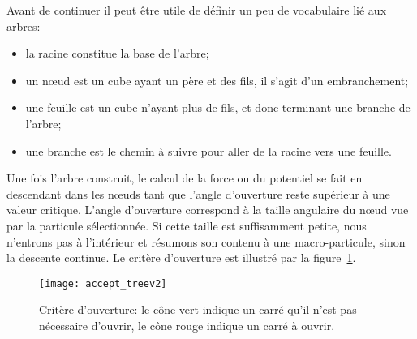 			Avant de continuer il peut être utile de définir un peu de vocabulaire lié aux arbres:
			\begin{itemize}
				\item la racine constitue la base de l'arbre;
				\item un nœud est un cube ayant un père et des fils, il s'agit d'un embranchement;
				\item une feuille est un cube n'ayant plus de fils, et donc terminant une branche de
					l'arbre;
				\item une branche est le chemin à suivre pour aller de la racine vers une feuille.
			\end{itemize}


			Une fois l'arbre construit, le calcul de la force ou du potentiel se fait en descendant dans les nœuds
			tant que l'angle d'ouverture reste supérieur à une valeur critique.
			L'angle d'ouverture correspond à la taille angulaire du nœud vue par la particule sélectionnée.
			Si cette taille est suffisamment petite, nous n'entrons pas à l'intérieur et résumons son
			contenu à une macro-particule, sinon la descente continue. Le critère d'ouverture est illustré par la
			figure~\ref{Fig::KDTree::Parcours}.

			\begin{figure}
				\begin{center}
					\texttt{[image: accept\_treev2]}
					\caption{\label{Fig::KDTree::Parcours}
						Critère d'ouverture: le cône vert indique un carré qu'il n'est pas nécessaire d'ouvrir, le cône rouge
					indique un carré à ouvrir.}
				\end{center}
			\end{figure}

